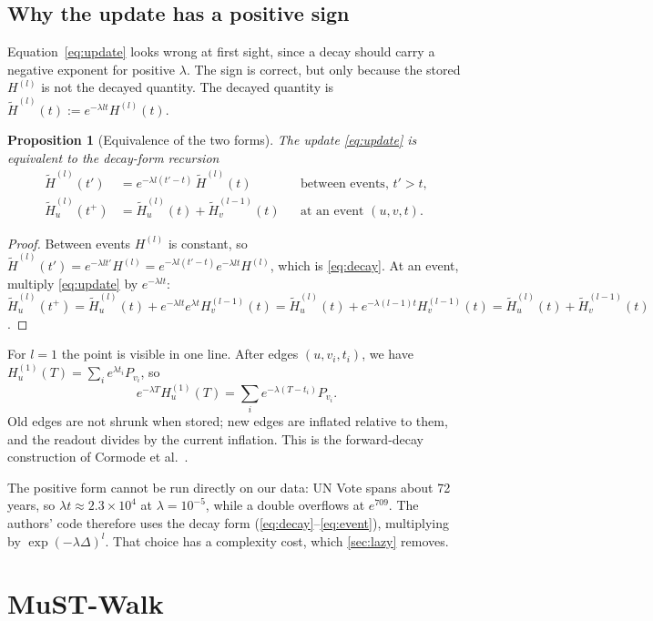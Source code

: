 \documentclass[11pt,a4paper]{article}
\newtheorem{proposition}{Proposition}
\theoremstyle{remark}
\newcommand{\tH}{\widetilde{H}}
\begin{document}
\subsection{Why the update has a positive sign}\label{sec:sign}
Equation~\eqref{eq:update} looks wrong at first sight, since a decay should carry a negative exponent for positive $\lambda$. The sign is correct, but only because the stored $H^{(l)}$ is not the decayed quantity. The decayed quantity is $\tH^{(l)}(t):=e^{-\lambda l t}H^{(l)}(t)$.

\begin{proposition}[Equivalence of the two forms]\label{prop:sign}
The update \eqref{eq:update} is equivalent to the decay-form recursion
\begin{align}
\tH^{(l)}(t') &= e^{-\lambda l (t'-t)}\,\tH^{(l)}(t) && \text{between events, } t'>t, \label{eq:decay}\\
\tH_u^{(l)}(t^{+}) &= \tH_u^{(l)}(t)+\tH_v^{(l-1)}(t) && \text{at an event } (u,v,t). \label{eq:event}
\end{align}
\end{proposition}
\begin{proof}
Between events $H^{(l)}$ is constant, so $\tH^{(l)}(t')=e^{-\lambda l t'}H^{(l)}=e^{-\lambda l(t'-t)}e^{-\lambda l t}H^{(l)}$, which is \eqref{eq:decay}. At an event, multiply \eqref{eq:update} by $e^{-\lambda l t}$:
$\tH_u^{(l)}(t^{+})=\tH_u^{(l)}(t)+e^{-\lambda l t}e^{\lambda t}H_v^{(l-1)}(t)=\tH_u^{(l)}(t)+e^{-\lambda(l-1)t}H_v^{(l-1)}(t)=\tH_u^{(l)}(t)+\tH_v^{(l-1)}(t)$.
\end{proof}
For $l=1$ the point is visible in one line. After edges $(u,v_i,t_i)$, we have $H_u^{(1)}(T)=\sum_i e^{\lambda t_i}P_{v_i}$, so
\begin{equation}
e^{-\lambda T}H_u^{(1)}(T)=\sum_i e^{-\lambda(T-t_i)}P_{v_i}.
\end{equation}
Old edges are not shrunk when stored; new edges are inflated relative to them, and the readout divides by the current inflation. This is the forward-decay construction of Cormode et al.\ \cite{forward}.

The positive form cannot be run directly on our data: UN Vote spans about 72 years, so $\lambda t\approx 2.3\times10^{4}$ at $\lambda=10^{-5}$, while a double overflows at $e^{709}$. The authors' code therefore uses the decay form (\ref{eq:decay}--\ref{eq:event}), multiplying by $\exp(-\lambda\Delta)^{l}$. That choice has a complexity cost, which \cref{sec:lazy} removes.

\section{MuST-Walk}\label{sec:method}
\end{document}

